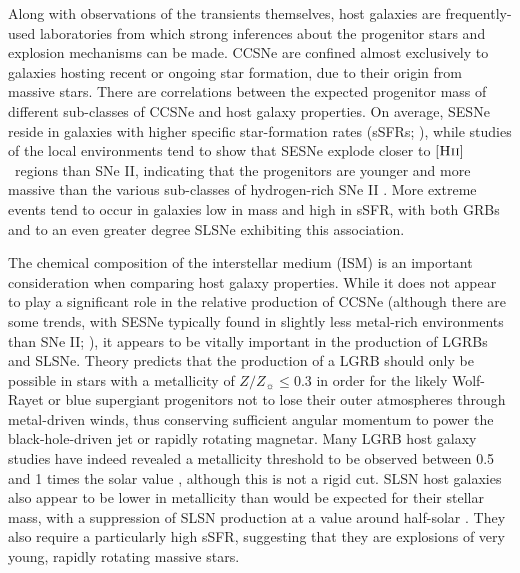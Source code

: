 \documentclass[fleqn,usenatbib,]{mnras}
\newcommand{\replychris}[1]{\color{magenta}#1 \color{black}}
\newcommand{\replylluis}[1]{\color{brown}#1 \color{black}}
\newcommand{\HII}[0]{$[\textnormal{\textsc{Hii}}]$}
\begin{document}
 Along with observations of the transients themselves, host galaxies are frequently-used laboratories from which strong inferences about the progenitor stars and explosion mechanisms can be made. CCSNe are confined almost exclusively to galaxies hosting recent or ongoing star formation, due to their origin from massive stars. There are correlations between the expected progenitor mass of different sub-classes of CCSNe and host galaxy properties. On average, SESNe reside in galaxies with higher specific star-formation rate\replychris{s} (sSFRs; \citealt{James2006,Kelly2008}), \replylluis{while studies of the local environments tend to show that SESNe explode closer to \HII~regions than SNe II, indicating that the progenitors are younger and more massive than the various sub-classes of hydrogen-rich SNe II  \citep[e.g.][]{Galbany2018}}. More extreme events tend to occur in galaxies low in mass and high in sSFR, with both GRBs \citep[e.g.][]{Fruchter2006,LeFloch2006,Levesque2010,Kruehler2015,Vergani2015,Perley2016b,Palmerio2019,Taggart2019} and to an even greater degree SLSNe \citep[e.g.][]{Neill2011,Lunnan2014,Leloudas2015,Angus2016,Schulze2018,Taggart2019} exhibiting this association.
 
 The chemical composition of the interstellar medium (ISM) is an important consideration when comparing host galaxy properties. While it does not appear to play a significant role in the relative production of CCSNe (although there are some trends, with SESNe typically found in slightly less metal-rich environments than SNe II; \citealt{Galbany2018}), it appears to be vitally important in the production of LGRBs and SLSNe. Theory predicts that the production of a LGRB should only be possible in stars with a metallicity of $Z/Z_{\sun}\leq 0.3$ \citep{Woosley1993}  in order for the likely Wolf-Rayet or blue supergiant progenitors not to lose their outer atmospheres through metal-driven winds, thus conserving sufficient angular momentum to power the black-hole-driven jet or rapidly rotating magnetar. Many LGRB host galaxy studies have indeed revealed a metallicity threshold to be observed between 0.5 and 1 times the solar value \citep[e.g.][]{Stanek2006,Modjaz2008,Kruehler2015,Perley2016b,Japelj2016,Vergani2017}, although this is not a rigid cut.  
SLSN host galaxies also appear to be lower in metallicity than would be expected for their stellar mass, with a suppression of SLSN production at a value around half-solar \citep{Lunnan2014,Chen2016a,Perley2016c}. They also require a particularly high sSFR, suggesting that they are explosions of very young, rapidly rotating massive stars.
 
\end{document}
